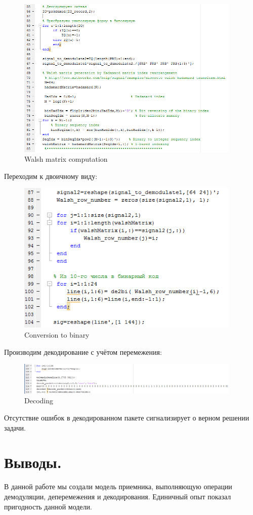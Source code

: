 \documentclass[a4paper,14pt]{extarticle}
\begin{document}
\begin{figure}[H]
\centering
\includegraphics[width=0.95\textwidth]{walsh}
\captionsetup{justification=centering,margin=1.0cm}
\caption{Walsh matrix computation}
\label{sig}
\end{figure}

Переходим к двоичному виду:

\begin{figure}[H]
\centering
\includegraphics[width=0.95\textwidth]{preint}
\captionsetup{justification=centering,margin=1.0cm}
\caption{Conversion to binary}
\label{sig}
\end{figure}

Производим декодирование с учётом перемежения:

\begin{figure}[H]
\centering
\includegraphics[width=0.95\textwidth]{postint}
\captionsetup{justification=centering,margin=1.0cm}
\caption{Decoding}
\label{sig}
\end{figure}

Отсутствие ошибок в декодированном пакете сигнализирует о верном решении задачи.

\vspace{8cm}

\section{Выводы.}

В данной работе мы создали модель приемника, выполняющую операции демодуляции, деперемежения и декодирования. Единичный опыт показал пригодность данной модели.
\end{document}
